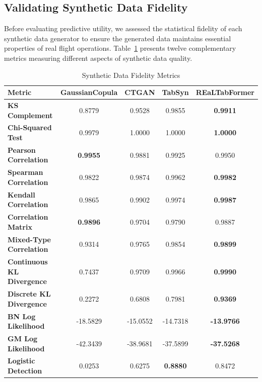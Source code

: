 \documentclass[conference]{IEEEtran}
\begin{document}
\subsection{Validating Synthetic Data Fidelity}
\label{sec:fidelity_results}

Before evaluating predictive utility, we assessed the statistical fidelity of each synthetic data generator to ensure the generated data maintains essential properties of real flight operations. Table~\ref{tab:fidelity_metrics} presents twelve complementary metrics measuring different aspects of synthetic data quality.

\begin{table}[!htbp]
\centering
\scriptsize
\setlength{\tabcolsep}{1pt}
\renewcommand{\arraystretch}{1.2}
\caption{Synthetic Data Fidelity Metrics}
\label{tab:fidelity_metrics}
\begin{tabular}{lcccc}
\toprule
\rowcolor{blue!15}
\textbf{Metric} & \textbf{GaussianCopula} & \textbf{CTGAN} & \textbf{TabSyn} & \textbf{REaLTabFormer} \\
\midrule
\rowcolor{gray!5}
\textbf{KS Complement} & 0.8779 & 0.9528 & 0.9855 & \textbf{0.9911} \\
\rowcolor{gray!20}
\textbf{Chi-Squared Test} & 0.9979 & 1.0000 & 1.0000 & \textbf{1.0000} \\
\rowcolor{gray!5}
\textbf{Pearson Correlation} & \textbf{0.9955} & 0.9881 & 0.9925 & 0.9950 \\
\rowcolor{gray!20}
\textbf{Spearman Correlation} & 0.9822 & 0.9874 & 0.9962 & \textbf{0.9982} \\
\rowcolor{gray!5}
\textbf{Kendall Correlation} & 0.9865 & 0.9902 & 0.9974 & \textbf{0.9987} \\
\rowcolor{gray!20}
\textbf{Correlation Matrix} & \textbf{0.9896} & 0.9704 & 0.9790 & 0.9887 \\
\rowcolor{gray!5}
\textbf{Mixed-Type Correlation} & 0.9314 & 0.9765 & 0.9854 & \textbf{0.9899} \\
\rowcolor{gray!20}
\textbf{Continuous KL Divergence} & 0.7437 & 0.9709 & 0.9966 & \textbf{0.9990} \\
\rowcolor{gray!5}
\textbf{Discrete KL Divergence} & 0.2272 & 0.6808 & 0.7981 & \textbf{0.9369} \\
\rowcolor{gray!20}
\textbf{BN Log Likelihood} & -18.5829 & -15.0552 & -14.7318 & \textbf{-13.9766} \\
\rowcolor{gray!5}
\textbf{GM Log Likelihood} & -42.3439 & -38.9681 & -37.5899 & \textbf{-37.5268} \\
\rowcolor{gray!20}
\textbf{Logistic Detection} & 0.0253 & 0.6275 & \textbf{0.8880} & 0.8472 \\
\bottomrule
\end{tabular}
\end{table}
\end{document}

